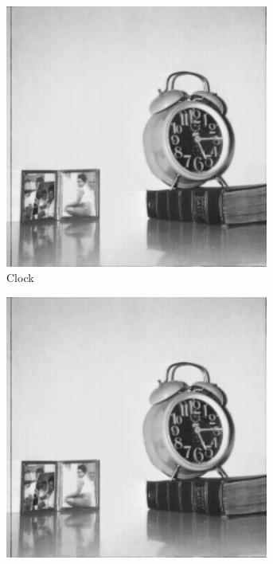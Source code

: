 \begin{figure}
\begin{subfigure}[b]{.23\textwidth}
  \centering
  \includegraphics[width=0.95\textwidth]{figures/test-images/original/clock}
  \caption{Clock}
  \label{fig:test-images-clock}
\end{subfigure}
\begin{subfigure}[b]{.23\textwidth}
  \centering
  \includegraphics[width=0.95\textwidth]{figures/test-images/truncate1/clock}

\end{subfigure}
\end{figure}
